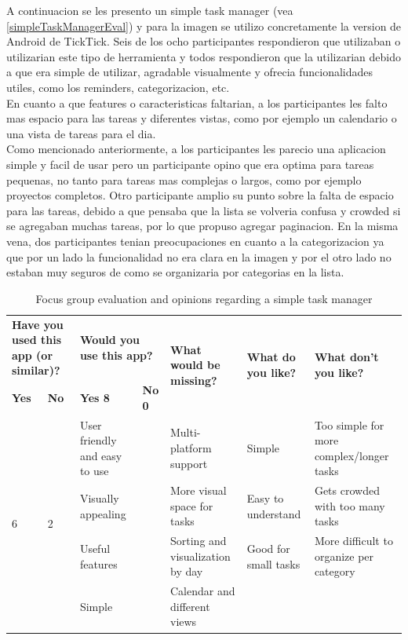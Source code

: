 A continuacion se les presento un simple task manager (vea \ref{simpleTaskManagerEval}) y para la imagen se utilizo concretamente la version de Android de TickTick. Seis de los ocho participantes respondieron que utilizaban o utilizarian este tipo de herramienta y todos respondieron que la utilizarian debido a que era simple de utilizar, agradable visualmente y ofrecia funcionalidades utiles, como los reminders, categorizacion, etc.\\
En cuanto a que features o caracteristicas faltarian, a los participantes les falto mas espacio para las tareas y diferentes vistas, como por ejemplo un calendario o una vista de tareas para el dia.\\
Como mencionado anteriormente, a los participantes les parecio una aplicacion simple y facil de usar pero un participante opino que era optima para tareas pequenas, no tanto para tareas mas complejas o largos, como por ejemplo proyectos completos. Otro participante amplio su punto sobre la falta de espacio para las tareas, debido a que pensaba que la lista se volveria confusa y crowded si se agregaban muchas tareas, por lo que propuso agregar paginacion. En la misma vena, dos participantes tenian preocupaciones en cuanto a la categorizacion ya que por un lado la funcionalidad no era clara en la imagen y por el otro lado no estaban muy seguros de como se organizaria por categorias en la lista.

\FloatBarrier
\begin{table}[!htbp]
    \centering
    \begin{adjustbox}{width=1.2\textwidth,center=\textwidth}
        \begin{tabular}{|l|l|l|l|l|l|l|}
        \hline
        \multicolumn{2}{|l}{\textbf{Have you used this app (or similar)?}} & \multicolumn{2}{|l|}{\textbf{Would you use this app?}} & \multirow{2}{*}{\textbf{What would be missing?}} & \multirow{2}{*}{\textbf{What do you like?}} & \multirow{2}{*}{\textbf{What don't you like?}} \\ \cline{1-4}
        \textbf{Yes} & \textbf{No} & \textbf{Yes   8} & \textbf{No  0} & & & \\
        \hline
        \multirow{5}{*}{ 6 } & \multirow{5}{*}{ 2 } & User friendly and easy to use & & Multi-platform support & Simple & Too simple for more complex/longer tasks \\ \cline{3-3} \cline{5-7} 
        & & Visually appealing & & More visual space for tasks & Easy to understand & Gets crowded with too many tasks \\ \cline{3-3} \cline{5-7} 
        & & Useful features & & Sorting and visualization by day & Good for small tasks & More difficult to organize per category \\ \cline{3-3} \cline{5-7} 
        & & Simple & & Calendar and different views & & \\ \cline{3-3} \hline
        \end{tabular}
    \end{adjustbox}
    \caption{Focus group evaluation and opinions regarding a simple task manager}
    \label{tab:simpleTaskManagerEval}
\end{table}
\FloatBarrier

